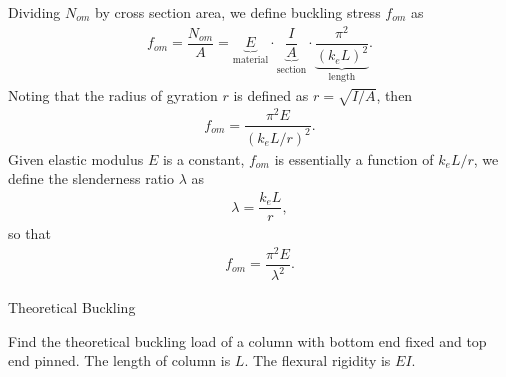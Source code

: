 Dividing $N_{om}$ by cross section area, we define buckling stress $f_{om}$ as
\begin{gather*}
f_{om}=\dfrac{N_{om}}{A}=\underbrace{E}_\text{material}\cdot\underbrace{\dfrac{I}{A}}_\text{section}\cdot\underbrace{\dfrac{\pi^2}{\left(k_eL\right)^2}}_\text{length}.
\end{gather*}
Noting that the radius of gyration $r$ is defined as $r=\sqrt{I/A}$, then
\begin{gather*}
f_{om}=\dfrac{\pi^2E}{\left(k_eL/r\right)^2}.
\end{gather*}
Given elastic modulus $E$ is a constant, $f_{om}$ is essentially a function of $k_eL/r$, we define the slenderness ratio $\lambda$ as
\begin{gather*}
\lambda=\dfrac{k_eL}{r},
\end{gather*}
so that
\begin{gather*}
f_{om}=\dfrac{\pi^2E}{\lambda^2}.
\end{gather*}
\begin{exmp}Theoretical Buckling

Find the theoretical buckling load of a column with bottom end fixed and top end pinned.
The length of column is $L$.
The flexural rigidity is $EI$.
\begin{figure}[H]
\footnotesize

\end{figure}
\end{exmp}
